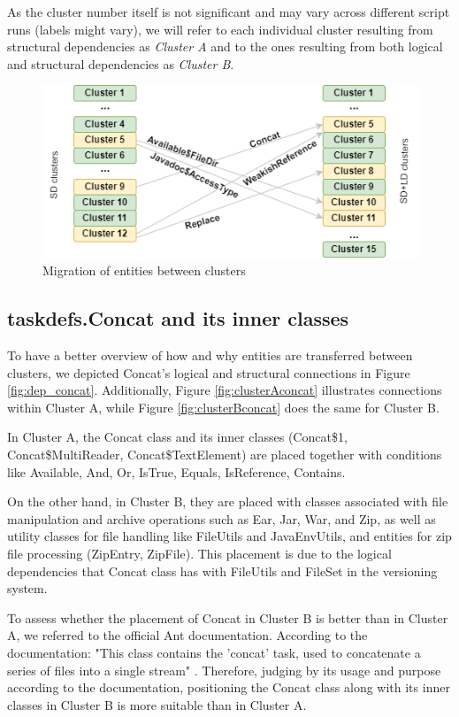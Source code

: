 \documentclass[conference]{IEEEtran}
\begin{document}
As the cluster number itself is not significant and may vary across different script runs (labels might vary), we will refer to each individual cluster resulting from structural dependencies as \textit{Cluster A} and to the ones resulting from both logical and structural dependencies as \textit{Cluster B}.

\begin{figure}
\centering
\includegraphics[width=\columnwidth]{clusters.png}
\caption{Migration of entities between clusters}
\label{fig:clustersmigration}
\centering
\end{figure}

\subsection{taskdefs.Concat and its inner classes}

To have a better overview of how and why entities are transferred between clusters, we depicted Concat's logical and structural connections in Figure \ref{fig:dep_concat}. Additionally, Figure \ref{fig:clusterAconcat} illustrates connections within Cluster A, while Figure \ref{fig:clusterBconcat} does the same for Cluster B.

In Cluster A, the Concat class and its inner classes (Concat\$1, Concat\$MultiReader, Concat\$TextElement) are placed together with conditions like Available, And, Or, IsTrue, Equals, IsReference, Contains.

On the other hand, in Cluster B, they are placed with classes associated with file manipulation and archive operations such as Ear, Jar, War, and Zip, as well as utility classes for file handling like FileUtils and JavaEnvUtils, and entities for zip file processing (ZipEntry, ZipFile). This placement is due to the logical dependencies that Concat class has with FileUtils and FileSet in the versioning system.

To assess whether the placement of Concat in Cluster B is better than in Cluster A, we referred to the official Ant documentation. According to the documentation: "This class contains the 'concat' task, used to concatenate a series of files into a single stream" \cite{ant_concat}. Therefore, judging by its usage and purpose according to the documentation, positioning the Concat class along with its inner classes in Cluster B is more suitable than in Cluster A.
\end{document}
